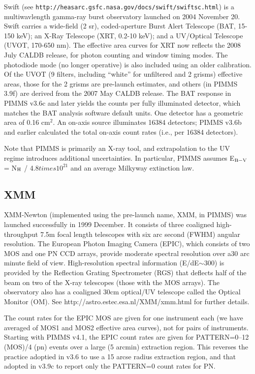 Swift (see {\tt http://heasarc.gsfc.nasa.gov/docs/swift/swiftsc.html}) is
a multiwavlength gamma-ray burst observatory launched on 2004 November 20.
Swift carries a wide-field (2 sr), coded-aperture Burst Alert Telescope
(BAT, 15-150 keV); an X-Ray Telescope (XRT, 0.2-10 keV); and a UV/Optical
Telescope (UVOT, 170-650 nm).  The effective area curves for XRT now
reflects the 2008 July CALDB release, for photon counting and window timing
modes.  The photodiode mode (no longer operative) is also included
using an older calibration.  Of the UVOT (9 filters, including ``white''
for unfiltered and 2 grisms) effective areas, those for the 2 grisms
are pre-launch estimates, and others (in PIMMS 3.9f) are derived from
the 2007 May CALDB release.  The BAT response in PIMMS v3.6c and later
yields the counts per fully illuminated detector, which matches the BAT
analysis software default units.  One detector has a geometric area of
0.16 cm$^2$.  An on-axis source illuminates 16384 detectors; PIMMS v3.6b
and earlier calculated the total on-axis count rates (i.e., per 16384
detectors).

Note that PIMMS is primarily an X-ray tool, and extrapolation to the
UV regime introduces additional uncertainties.  In particular, PIMMS
assumes E$_{\rm B-V}$ = N$_{\rm H}$ / 4.8$times 10^{21}$
and an average Milkyway extinction law.

\subsection{XMM}

XMM-Newton (implemented using the pre-launch name, XMM, in PIMMS) was launched
successfully in 1999 December.  It consists of three coaligned
high-throughput 7.5m focal length telescopes with six arc second (FWHM)
angular resolution.  The European Photon Imaging Camera (EPIC), which
consists of two MOS and one PN CCD arrays, provide moderate spectral
resolution over a30 arc minute field of view.  High-resolution
spectral information (E/dE$\sim$300) is provided by the Reflection Grating
Spectrometer (RGS) that deflects half of the beam on two of the X-ray
telescopes (those with the MOS arrays).  The observatory also has a
coaligned 30cm optical/UV telescope called the Optical Monitor (OM).  
See http://astro.estec.esa.nl/XMM/xmm.html for further details.

The count rates for the EPIC MOS are given for one instrument each
(we have averaged of MOS1 and MOS2 effective area curves), not for
pairs of instruments.  Starting with PIMMS v4.1, the EPIC count rates are
given for PATTERN=0--12 (MOS)/4 (pn) events over a large (5 arcmin)
extraction region.  This reverses the practice adoptied in v3.6
to use a 15 arcse radius extraction region, and that adopted in
v3.9c to report only the PATTERN=0 count rates for PN.

